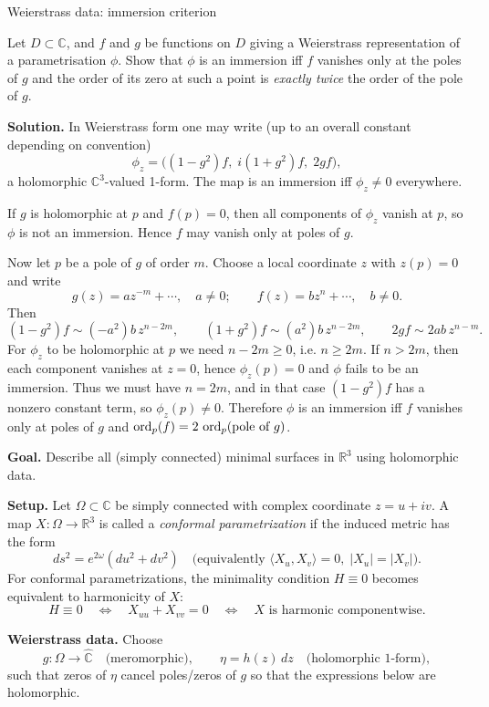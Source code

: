 \begin{problem}[CP-IV-0044]
\label{prob:cp-iv-0044}
Weierstrass data: immersion criterion

Let $D\subset\mathbb C$, and $f$ and $g$ be functions on $D$ giving a Weierstrass representation of a
	parametrisation $\phi$. Show that $\phi$ is an immersion iff $f$ vanishes only at the poles of $g$ and the
	order of its zero at such a point is \emph{exactly twice} the order of the pole of $g$.

	\medskip
	\textbf{Solution.}
	In Weierstrass form one may write (up to an overall constant depending on convention)
	\[
	\phi_z = \big((1-g^2)f,\; i(1+g^2)f,\; 2gf\big),
	\]
	a holomorphic $\mathbb C^3$-valued 1-form. The map is an immersion iff $\phi_z\neq 0$ everywhere.

	If $g$ is holomorphic at $p$ and $f(p)=0$, then all components of $\phi_z$ vanish at $p$, so $\phi$ is not an
	immersion. Hence $f$ may vanish only at poles of $g$.

	Now let $p$ be a pole of $g$ of order $m$. Choose a local coordinate $z$ with $z(p)=0$ and write
	\[
	g(z)=a z^{-m}+\cdots,\quad a\neq 0;\qquad f(z)=b z^{n}+\cdots,\quad b\neq 0.
	\]
	Then
	\[
	(1-g^2)f \sim (-a^2)b\,z^{n-2m},\qquad (1+g^2)f\sim (a^2)b\,z^{n-2m},\qquad 2gf\sim 2ab\,z^{n-m}.
	\]
	For $\phi_z$ to be holomorphic at $p$ we need $n-2m\ge 0$, i.e. $n\ge 2m$.
	If $n>2m$, then each component vanishes at $z=0$, hence $\phi_z(p)=0$ and $\phi$ fails to be an immersion.
	Thus we must have $n=2m$, and in that case $(1-g^2)f$ has a nonzero constant term, so $\phi_z(p)\neq 0$.
	Therefore $\phi$ is an immersion iff $f$ vanishes only at poles of $g$ and $\operatorname{ord}_p(f)=2\,\operatorname{ord}_p(\text{pole of }g)$.
	

	\textbf{Goal.} Describe all (simply connected) minimal surfaces in $\mathbb{R}^3$ using holomorphic data.

	\medskip
	\textbf{Setup.}
	Let $\Omega\subset\mathbb{C}$ be simply connected with complex coordinate $z=u+iv$.
	A map $X:\Omega\to\mathbb{R}^3$ is called a \emph{conformal parametrization} if the induced metric has the form
	\[
	ds^2 = e^{2\omega}(du^2+dv^2)
	\quad\text{(equivalently } \langle X_u,X_v\rangle=0,\; |X_u|=|X_v|\text{)}.
	\]
	For conformal parametrizations, the minimality condition $H\equiv 0$ becomes equivalent to harmonicity of $X$:
	\[
	H\equiv 0 \quad\Longleftrightarrow\quad X_{uu}+X_{vv}=0
	\quad\Longleftrightarrow\quad X \text{ is harmonic componentwise.}
	\]

	\medskip
	\textbf{Weierstrass data.}
	Choose
	\[
	g:\Omega\to\widehat{\mathbb{C}} \quad\text{(meromorphic)},\qquad
	\eta = h(z)\,dz \quad\text{(holomorphic 1-form)},
	\]
	such that zeros of $\eta$ cancel poles/zeros of $g$ so that the expressions below are holomorphic.


\end{problem}
